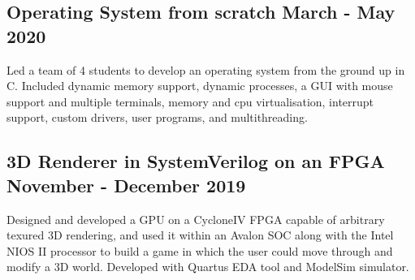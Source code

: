\documentclass[letterpaper,11pt]{article}
\begin{document}
    \subsection{Operating System from scratch \null\hfill March - May 2020}
    \vspace*{-2mm}
    Led a team of 4 students to develop an operating system from the ground up in C. Included dynamic memory support, dynamic processes, a GUI with mouse support and multiple terminals, memory and cpu virtualisation, interrupt support, custom drivers, user programs, and multithreading.
    \vspace*{-2mm}
    \subsection{3D Renderer in SystemVerilog on an FPGA \null\hfill November - December 2019}
    \vspace*{-2mm}
    Designed and developed a GPU on a CycloneIV FPGA capable of arbitrary texured 3D rendering, and used it within an Avalon SOC along with the Intel NIOS II processor to build a game in which the user could move through and modify a 3D world. Developed with Quartus EDA tool and ModelSim simulator.
    \vspace*{-2mm}
\end{document}
